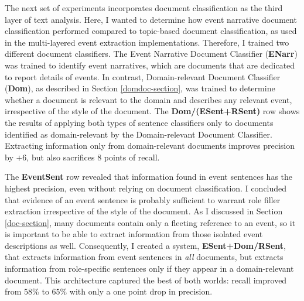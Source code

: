 


The next set of experiments incorporates document classification as
the third layer of text analysis. 
Here, I wanted to determine how event narrative document classification 
performed compared to topic-based document classification, as used 
in the multi-layered event extraction implementations. 
Therefore, I trained two different document classifiers. 
The Event Narrative Document Classifier ({\bf ENarr}) 
was trained to identify event narratives, which are documents 
that are dedicated to report details of events.  
In contrast, Domain-relevant Document Classifier ({\bf Dom}), as described in
Section \ref{domdoc-section},  
was trained to determine whether a document 
is relevant
to the domain and describes any relevant event, irrespective of  the style of the
document.
The \textbf{Dom/(ESent+RSent)} row shows the results of 
applying both types of sentence classifiers only to documents identified as
domain-relevant by the Domain-relevant Document Classifier. 
Extracting information only from
domain-relevant documents improves precision by $+6$, but also
sacrifices $8$ points of recall. 

The \textbf{EventSent} row revealed that information found in event
sentences has the highest precision, even without relying on document
classification. I concluded that evidence of an event sentence is
probably sufficient to warrant role filler extraction irrespective of
the style of the document. As I discussed in Section \ref{doc-section},
many documents contain only a fleeting reference to an event, so it is
important to be able to  extract information from those isolated
event descriptions as well. Consequently, I created a system,
\textbf{ESent+Dom/RSent}, that extracts information
from  event sentences in {\it all} documents, but  extracts information
from role-specific sentences only if they appear in a domain-relevant
document. This architecture captured the best of both worlds: recall
improved from $58$\% to $65$\% with only a one point drop in precision.






